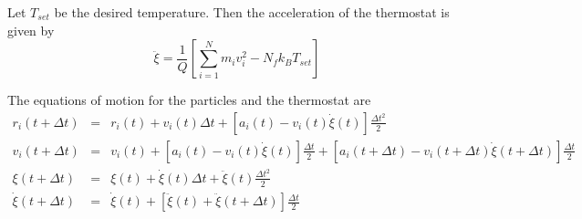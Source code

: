 Let $T_{set}$ be the desired temperature.
%
Then the acceleration of the thermostat is given by
\begin{equation}
\ddot{\xi} = \frac{1}{Q} \left[ \sum_{i=1}^{N} m_i v_i^2 - N_f k_B T_{set} \right]
\end{equation}

The equations of motion for the particles and the thermostat are
\begin{eqnarray}
r_i(t + \Delta t) &=& r_i(t) + v_i(t) \Delta t + \left[ a_i(t) - v_i(t)\dot{\xi}(t) \right] \frac{\Delta t^2}{2}\\
v_i(t + \Delta t) &=& v_i(t) + \left[ a_i(t) - v_i(t) \dot{\xi}(t) \right] \frac{\Delta t}{2} + \left[a_i(t + \Delta t)  - v_i(t + \Delta t) \dot{\xi}(t + \Delta t) \right] \frac{\Delta t}{2} \\
\xi(t + \Delta t) & = & \xi(t) + \dot{\xi}(t) \Delta t + \ddot{\xi}(t) \frac{\Delta t^2 }{2} \\
\dot{\xi}(t + \Delta t)  & = & \dot{\xi}(t) + \left[ \ddot{\xi}(t) + \ddot{\xi} (t + \Delta t)  \right] \frac{\Delta t}{2}
\end{eqnarray}

